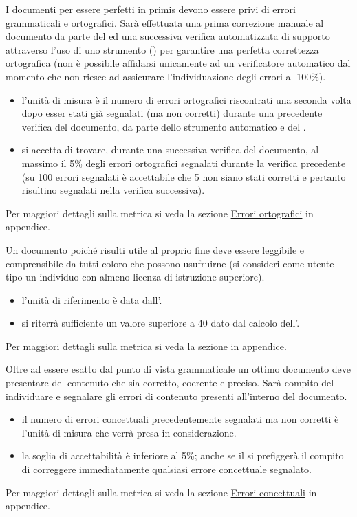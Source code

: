 \documentclass[a4paper, titlepage]{article}
\begin{document}
I documenti per essere perfetti in primis devono essere privi di errori grammaticali e ortografici. Sarà effettuata una prima correzione manuale al documento da parte del  ed una successiva verifica automatizzata di supporto attraverso l'uso di uno strumento () per garantire una perfetta correttezza ortografica (non è possibile affidarsi unicamente ad un verificatore automatico dal momento che non riesce ad assicurare l'individuazione degli errori al 100\%).  
\begin{itemize}
\item {} l'unità di misura è il numero di errori ortografici riscontrati una seconda volta dopo esser stati già segnalati (ma non corretti) durante una precedente verifica del documento, da parte dello strumento automatico e del .
\item {} si accetta di trovare, durante una successiva verifica del documento, al massimo il 5\% degli errori ortografici segnalati durante la verifica precedente (su 100 errori segnalati è accettabile che 5 non siano stati corretti e pertanto risultino segnalati nella verifica successiva).
\end{itemize}
Per maggiori dettagli sulla metrica si veda la sezione \hyperref[par:errort]{Errori ortografici} in appendice.

Un documento poiché risulti utile al proprio fine deve essere leggibile e comprensibile da tutti coloro che possono usufruirne (si consideri come utente tipo un individuo con almeno licenza di istruzione superiore).
\begin{itemize}
\item {} l'unità di riferimento è data dall'.
\item {} si riterrà sufficiente un valore superiore a 40 dato dal calcolo dell'.
\end{itemize}
Per maggiori dettagli sulla metrica si veda la sezione \hyperref[par:IG]{} in appendice.

Oltre ad essere esatto dal punto di vista grammaticale un ottimo documento deve presentare del contenuto che sia corretto, coerente e preciso. Sarà compito del  individuare e segnalare gli errori di contenuto presenti all'interno del documento.
\begin{itemize}
\item {} il numero di errori concettuali precedentemente segnalati ma non corretti è l'unità di misura che verrà presa in considerazione.
\item {} la soglia di accettabilità è inferiore al 5\%; anche se il  si prefiggerà il compito di correggere immediatamente qualsiasi errore concettuale segnalato. 
\end{itemize}
Per maggiori dettagli sulla metrica si veda la sezione \hyperref[par:errcon]{Errori concettuali} in appendice.
\end{document}
